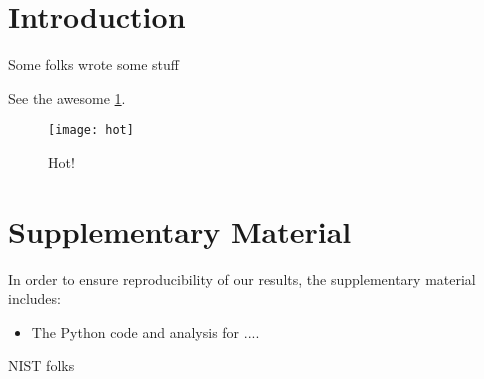 
    
    \section{Introduction}

    Some folks wrote some stuff \cite{Span-BOOK-2000}

    See the awesome \cref{fig:hot}.

    \begin{figure}[H]
    \caption{Hot! \label{fig:hot}}
    \texttt{[image: hot]}
    \end{figure}
    

    \section{Supplementary Material}
    In order to ensure reproducibility of our results, the supplementary material includes:
    \begin{itemize}
    	\item The Python code and analysis for ....
    \end{itemize}

    \begin{acknowledgments}
    NIST folks
    \end{acknowledgments}
    
	
